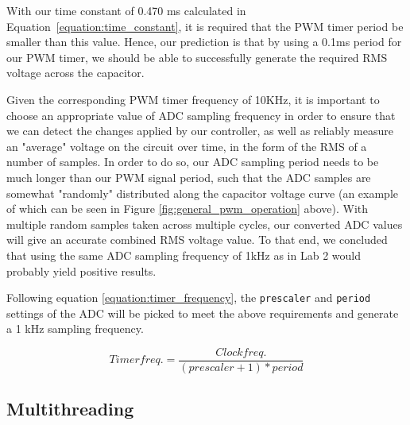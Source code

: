 With our time constant of 0.470 ms calculated in Equation~\ref{equation:time_constant}, it is required that the PWM timer period be smaller than this value. Hence, our prediction is that by using a 0.1ms period for our PWM timer, we should be able to successfully generate the required RMS voltage across the capacitor.

Given the corresponding PWM timer frequency of 10KHz, it is important to choose an appropriate value of ADC sampling frequency in order to ensure that we can detect the changes applied by our controller, as well as reliably measure an "average" voltage on the circuit over time, in the form of the RMS of a number of samples. In order to do so, our ADC sampling period needs to be much longer than our PWM signal period, such that the ADC samples are somewhat "randomly" distributed along the capacitor voltage curve (an example of which can be seen in Figure \ref{fig:general_pwm_operation} above). With multiple random samples taken across multiple cycles, our converted ADC values will give an accurate combined RMS voltage value. To that end, we concluded that using the same ADC sampling frequency of 1kHz as in Lab 2 would probably yield positive results.

Following equation \ref{equation:timer_frequency}, the \verb|prescaler| and \verb|period| settings of the ADC will be picked to meet the above requirements and generate a 1 kHz sampling frequency. 

\begin{equation}
\label{equation:timer_frequency}
 Timer freq. = \frac{Clock freq.}{(prescaler + 1) * period}
\end{equation}


\subsection{Multithreading}



